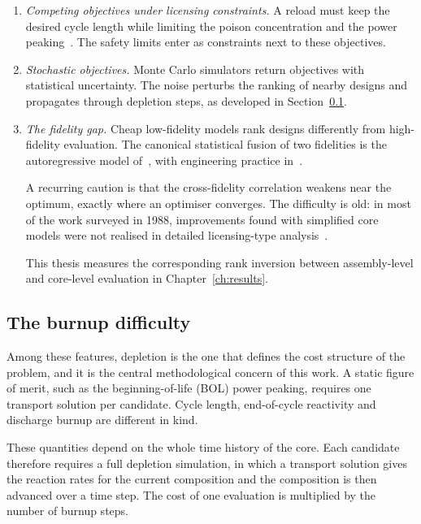\begin{enumerate}
  \item \emph{Competing objectives under licensing constraints.} A reload
        must keep the desired cycle length while limiting the poison
        concentration and the power peaking~\cite{stewart_2021}. The
        safety limits enter as constraints next to these objectives.

  \item \emph{Stochastic objectives.} Monte Carlo simulators return
        objectives with statistical uncertainty. The noise perturbs the
        ranking of nearby designs and propagates through depletion
        steps, as developed in Section~\ref{sec:lit-opt-burnup}.

  \item \emph{The fidelity gap.} Cheap low-fidelity models rank designs
        differently from high-fidelity evaluation. The canonical
        statistical fusion of two fidelities is the autoregressive model
        of~\cite{kennedy_ohagan_2000}, with engineering practice
        in~\cite{forrester_book_2008}.

        A recurring caution is that the cross-fidelity correlation
        weakens near the optimum, exactly where an optimiser converges.
        The difficulty is old: in most of the work surveyed in 1988,
        improvements found with simplified core models were not realised
        in detailed licensing-type analysis~\cite{downar_1988}.

        This thesis measures the corresponding rank inversion between
        assembly-level and core-level evaluation in
        Chapter~\ref{ch:results}.
\end{enumerate}

\subsection{The burnup difficulty}
\label{sec:lit-opt-burnup}

Among these features, depletion is the one that defines the cost
structure of the problem, and it is the central methodological concern
of this work. A static figure of merit, such as the beginning-of-life
(BOL) power peaking, requires one transport solution per candidate.
Cycle length, end-of-cycle reactivity and discharge burnup are different
in kind.

These quantities depend on the whole time history of the core. Each
candidate therefore requires a full depletion simulation, in which a
transport solution gives the reaction rates for the current composition
and the composition is then advanced over a time step. The cost of one
evaluation is multiplied by the number of burnup steps.

